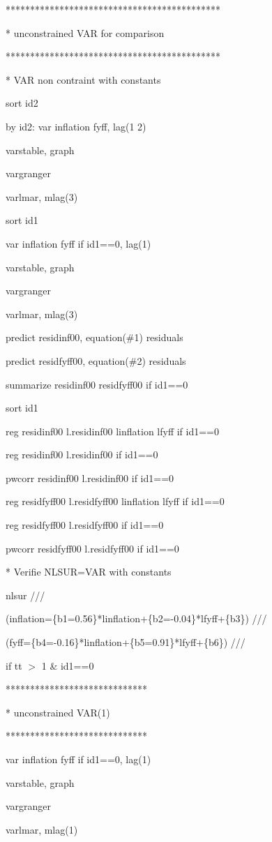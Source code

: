 \documentclass[12pt,a4paper]{article}%
\begin{document}
********************************************

* unconstrained VAR for comparison

********************************************

* VAR non contraint with constants

sort id2

by id2: var inflation fyff, lag(1 2)

varstable, graph

vargranger

varlmar, mlag(3)

sort id1

var inflation fyff if id1==0, lag(1)

varstable, graph

vargranger

varlmar, mlag(3)

predict residinf00, equation(\#1) residuals

predict residfyff00, equation(\#2) residuals

summarize residinf00 residfyff00 if id1==0

sort id1

reg residinf00 l.residinf00 linflation lfyff if id1==0

reg residinf00 l.residinf00 if id1==0

pwcorr residinf00 l.residinf00 if id1==0

reg residfyff00 l.residfyff00 linflation lfyff if id1==0

reg residfyff00 l.residfyff00 if id1==0

pwcorr residfyff00 l.residfyff00 if id1==0

* Verifie NLSUR=VAR with constants

nlsur ///

(inflation=\{b1=0.56\}*linflation+\{b2=-0.04\}*lfyff+\{b3\}) ///

(fyff=\{b4=-0.16\}*linflation+\{b5=0.91\}*lfyff+\{b6\}) ///

if tt%
$>$%
1 \& id1==0

*****************************

* unconstrained VAR(1)

*****************************

var inflation fyff if id1==0, lag(1)

varstable, graph

vargranger

varlmar, mlag(1)
\end{document}
